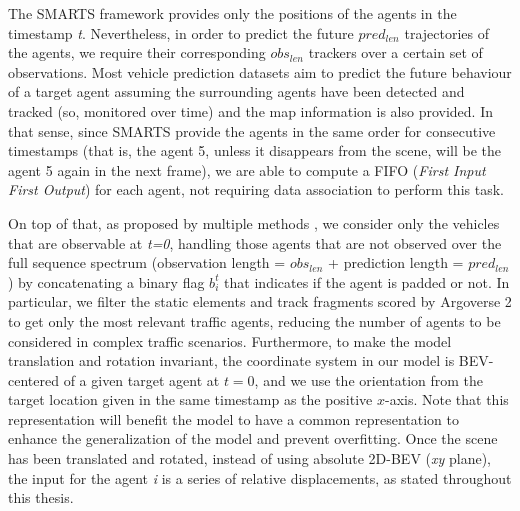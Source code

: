 The SMARTS \cite{SMARTS} framework provides only the positions of the agents in the timestamp \textit{t}. Nevertheless, in order to predict the future $pred_{len}$ trajectories of the agents, we require their corresponding $obs_{len}$ trackers over a certain set of observations. Most vehicle prediction datasets \cite{wilson2023argoverse} aim to predict the future behaviour of a target agent assuming the surrounding agents have been detected and tracked (so, monitored over time) and the map information is also provided. In that sense, since SMARTS provide the agents in the same order for consecutive timestamps (that is, the agent 5, unless it disappears from the scene, will be the agent 5 again in the next frame), we are able to compute a FIFO (\textit{First Input First Output}) for each agent, not requiring data association \cite{kuhn1955hungarian} to perform this task. 

On top of that, as proposed by multiple methods \cite{liang2020learning, gomez2023improving}, we consider only the vehicles that are observable at \textit{t=0}, handling those agents that are not observed over the full sequence spectrum (observation length = \textit{$obs_{len}$} + prediction length = \textit{$pred_{len}$}) by concatenating a binary flag $b_i^t$ that indicates if the agent is padded or not. In particular, we filter the static elements and track fragments scored by Argoverse 2 to get only the most relevant traffic agents, reducing the number of agents to be considered in complex traffic scenarios. Furthermore, to make the model translation and rotation invariant, the coordinate system in our model is BEV-centered of a given target agent at $t = 0$, and we use the orientation from the target location given in the same timestamp as the positive $x$-axis. Note that this representation will benefit the model to have a common representation to enhance the generalization of the model and prevent overfitting. Once the scene has been translated and rotated, instead of using absolute 2D-BEV (\textit{xy} plane), the input for the agent \textit{i} is a series of relative displacements, as stated throughout this thesis.

